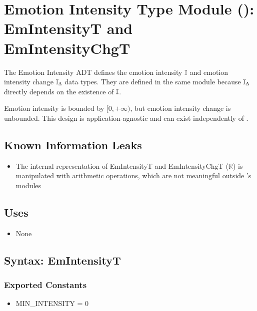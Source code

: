 \section[Emotion Intensity Type Module (\mref{mIntensity}): EmIntensityT and
EmIntensityChgT]{Emotion Intensity Type Module ():
EmIntensityT and \\ EmIntensityChgT}\label{intensityModule}
The Emotion Intensity ADT defines the emotion intensity $\mathbb{I}$
and emotion intensity change $\mathbb{I}_{\Delta}$ data types. They are defined
in the same module because $\mathbb{I}_{\Delta}$ directly depends on the
existence of $\mathbb{I}$.

Emotion intensity is bounded by $[0, +\infty)$, but emotion intensity change is
unbounded. This design is application-agnostic and can exist independently of
\progname{}.

\subsection{Known Information Leaks}
\begin{itemize}

    \item The internal representation of EmIntensityT and EmIntensityChgT
    ($\mathbb{R}$) is manipulated with arithmetic operations, which are not
    meaningful outside \progname{}'s modules

\end{itemize}

\subsection{Uses}
\begin{itemize}[noitemsep, nosep]

    \item None

\end{itemize}

\subsection{Syntax: EmIntensityT}

\subsubsection{Exported Constants}

\begin{itemize}

    \item MIN\_INTENSITY = 0

\end{itemize}

